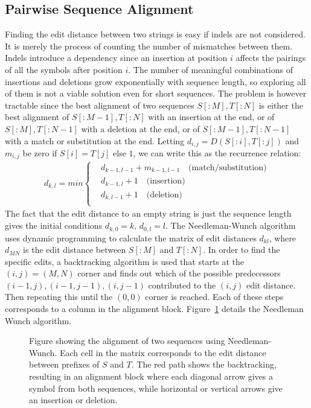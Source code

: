 \subsection{Pairwise Sequence Alignment}
\label{sec:pairwise}
Finding the edit distance between two strings is easy if indels are not considered.
It is merely the process of counting the number of mismatches between them.
Indels introduce a dependency since an insertion at position $i$ affects the pairings of all the symbols after position $i$.
The number of meaningful combinations of insertions and deletions grow exponentially with sequence length, so exploring all of them is not a viable solution even for short sequences.
The problem is however tractable since the best alignment of two sequences $S[:M], T[:N]$ is either the best alignment of $S[:M-1], T[:N]$ with an insertion at the end, or of $S[:M], T[:N-1]$ with a deletion at the end, or of $S[:M-1], T[:N-1]$ with a match or substitution at the end. 
Letting $d_{i,j} = D(S[:i], T[:j])$ and $m_{i,j}$ be zero if $S[i]=T[j]$ else $1$, we can write this as the recurrence relation:
\begin{align*}
  d_{k,l} = min\begin{cases}
  &d_{k-1,l-1}+m_{k-1, l-1}\quad \text{(match/substitution)}\\
  &d_{k-1,l}+1 \quad \text{(insertion)}\\
  &d_{k, l-1}+1 \quad \text{(deletion)}\\
\end{cases}
\end{align*}
The fact that the edit distance to an empty string is just the sequence length gives the initial conditions $d_{k, 0}=k,\,d_{0,l}=l$.
The Needleman-Wunch algorithm~\cite{needlemanwunch} uses dynamic programming to calculate the matrix of edit distances $d_{kl}$, where $d_{MN}$ is the edit distance between $S[:M]$ and $T[:N]$.
In order to find the specific edits, a backtracking algorithm is used that starts at the $(i, j) = (M, N)$ corner and finds out which of the possible predecessors $(i-1, j), (i-1, j-1), (i, j-1)$ contributed to the $(i, j)$ edit distance.
Then repeating this until the $(0, 0)$ corner is reached. Each of these steps corresponds to a column in the alignment block.
Figure~\ref{fig:needle} details the Needleman Wunch algorithm.
\begin{figure}
  \begin{tikzpicture}
    
  \end{tikzpicture}
  \caption{Figure showing the alignment of two sequences using Needleman-Wunch. Each cell in the matrix corresponds to the edit distance between prefixes of $S$ and $T$. The red path shows the backtracking, resulting in an alignment block where each diagonal arrow gives a symbol from both sequences, while horizontal or vertical arrows give an insertion or deletion.}
  \label{fig:needle}
\end{figure}

